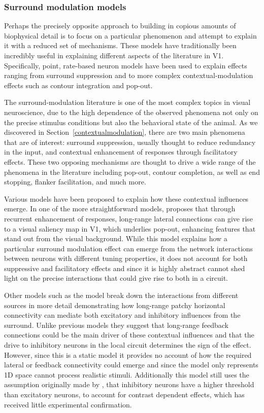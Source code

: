 \subsubsection*{Surround modulation models} \label{SRmodels}

Perhaps the precisely opposite approach to building in copious amounts
of biophysical detail is to focus on a particular phenomenon and
attempt to explain it with a reduced set of mechanisms. These models
have traditionally been incredibly useful in explaining different
aspects of the literature in V1. Specifically, point, rate-based
neuron models have been used to explain effects ranging from surround
suppression and to more complex contextual-modulation effects such as
contour integration and pop-out.

The surround-modulation literature is one of the most complex topics
in visual neuroscience, due to the high dependence of the observed
phenomena not only on the precise stimulus conditions but also the
behavioral state of the animal. As we discovered in
Section~\ref{contextualmodulation}, there are two main phenomena that
are of interest: surround suppression, usually thought to reduce
redundancy in the input, and contextual enhancement of responses
through facilitatory effects. These two opposing mechanisms are
thought to drive a wide range of the phenomena in the literature
including pop-out, contour completion, as well as end stopping,
flanker facilitation, and much more.

Various models have been proposed to explain how these contextual
influences emerge. In one of the more straightforward models,
\cite{Li2002} proposes that through recurrent enhancement of
responses, long-range lateral connections can give rise to a visual
saliency map in V1, which underlies pop-out, enhancing features that
stand out from the visual background. While this model explains how a
particular surround modulation effect can emerge from the network
interactions between neurons with different tuning properties, it does
not account for both suppressive and facilitatory effects and since it
is highly abstract cannot shed light on the precise interactions that
could give rise to both in a circuit.

Other models such as the \cite{Schwabe2006} model break down the
interactions from different sources in more detail demonstrating how
long-range patchy horizontal connectivity can mediate both excitatory
and inhibitory influences from the surround. Unlike previous models
they suggest that long-range feedback connections could be the main
driver of these contextual influences and that the drive to inhibitory
neurons in the local circuit determines the sign of the
effect. However, since this is a static model it provides no account
of how the required lateral or feedback connectivity could emerge and
since the model only represents 1D space cannot process realistic
stimuli. Additionally this model still uses the assumption originally
made by \cite{Somers1998}, that inhibitory neurons have a higher
threshold than excitatory neurons, to account for contrast dependent
effects, which has received little experimental confirmation.

